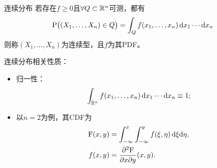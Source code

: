 \begin{definition}
	{连续分布}{}
	若存在$f\geqslant 0$且$\forall Q\subset\mathbb R^n$可测，都有
	\[
		\operatorname{P}\bigl((X_1,\ldots,X_n)\in Q\bigr)=\int_Qf(x_1,\ldots,x_n)\mathop{}\!\mathrm{d} x_1\cdots\mathop{}\!\mathrm{d} x_n
	\]
	则称$(X_1,\ldots,X_n)$为连续型，且$f$为其PDF。
\end{definition}

\begin{corollary}
	连续分布相关性质：
	\begin{itemize}
		\item 归一性：
		\begin{equation}
			\int_{\mathbb R^n}f(x_1,\ldots,x_n)\mathop{}\!\mathrm{d} x_1\cdots\mathop{}\!\mathrm{d} x_n\equiv 1;
		\end{equation}
		\item 以$n=2$为例，其CDF为
		\begin{subequations}
			\begin{align}
				\operatorname{F}(x,y)&=\int_{-\infty}^x\int_{-\infty}^yf(\xi,\eta)\mathop{}\!\mathrm{d}\xi\mathrm{d}\eta,\\
				f(x,y)&=\frac{\partial^2{\operatorname{F}}}{\partial{x}\partial{y}}(x,y).
			\end{align}
		\end{subequations}
	\end{itemize}
\end{corollary}

